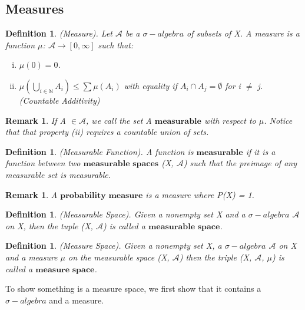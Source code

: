 \documentclass[twoside]{article}
\newtheorem{remark}[theorem]{Remark}
\newtheorem{definition}[theorem]{Definition}
\newcommand{\sa}{\sigma-algebra}
\begin{document}
\subsection{Measures}

\begin{definition}
(Measure). Let $\mathcal{A}$ be a $\sa$ of subsets of X. A measure is a function $\mu$: $\mathcal{A} \rightarrow [0, \infty]$ such that:
\begin{enumerate}[(i)]
  \item $\mu(0) = 0$.
  \item $\mu(\bigcup_{i \in \mathbb{N}} A_i) \leq \sum\mu(A_i)$ with equality if $A_i \cap A_j = \emptyset$ for i $\neq$ j. (Countable Additivity)
\end{enumerate}
\end{definition}

\begin{remark}
If A $\in \mathcal{A}$, we call the set A $\textbf{measurable}$ with respect to $\mu$. Notice that that property (ii) requires a countable union of sets.
\end{remark}

\begin{definition}
(Measurable Function). A function is $\textbf{measurable}$ if it is a function between two $\textbf{measurable spaces}$ (X, $\mathcal{A}$) such that the preimage of any measurable set is measurable.
\end{definition}

\begin{remark}
A $\textbf{probability measure}$ is a measure where P(X) = 1.
\end{remark}

\begin{definition}
(Measurable Space). Given a nonempty set X and a $\sa$ $\mathcal{A}$ on X, then the tuple (X, $\mathcal{A}$) is called a $\textbf{measurable space}$.
\end{definition}

\begin{definition}
(Measure Space). Given a nonempty set X, a $\sa$ $\mathcal{A}$ on X and a measure $\mu$ on the measurable space (X, $\mathcal{A}$) then the triple (X, $\mathcal{A}$, $\mu$) is called a $\textbf{measure space}$.
\end{definition}

To show something is a measure space, we first show that it contains a $\sa$ and a measure.
\end{document}
